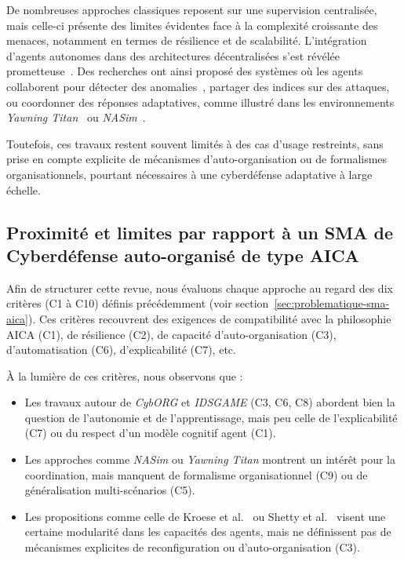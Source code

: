 \documentclass[ twoside,openright,titlepage,numbers=noenddot,headinclude,%
                footinclude=true,cleardoublepage=empty,abstractoff, %
                BCOR=5mm,paper=a4,fontsize=11pt,%
                french,american,%
                ]{scrreprt}
\begin{document}
De nombreuses approches classiques reposent sur une supervision centralisée, mais celle-ci présente des limites évidentes face à la complexité croissante des menaces, notamment en termes de résilience et de scalabilité. L'intégration d'agents autonomes dans des architectures décentralisées s'est révélée prometteuse~\cite{Sommer2010, Buczak2016}. Des recherches ont ainsi proposé des systèmes où les agents collaborent pour détecter des anomalies~\cite{Zhang2020, Nguyen2021}, partager des indices sur des attaques, ou coordonner des réponses adaptatives, comme illustré dans les environnements \emph{Yawning Titan}~\cite{Kroese2021} ou \emph{NASim}~\cite{Shetty2021}.

Toutefois, ces travaux restent souvent limités à des cas d'usage restreints, sans prise en compte explicite de mécanismes d'auto-organisation ou de formalismes organisationnels, pourtant nécessaires à une cyberdéfense adaptative à large échelle.

\subsection*{Proximité et limites par rapport à un SMA de Cyberdéfense auto-organisé de type AICA}

Afin de structurer cette revue, nous évaluons chaque approche au regard des dix critères (C1 à C10) définis précédemment (voir section~\ref{sec:problematique-sma-aica}). Ces critères recouvrent des exigences de compatibilité avec la philosophie AICA (C1), de résilience (C2), de capacité d'auto-organisation (C3), d'automatisation (C6), d'explicabilité (C7), etc.

À la lumière de ces critères, nous observons que :
\begin{itemize}
    \item Les travaux autour de \emph{CybORG} et \emph{IDSGAME} (C3, C6, C8) abordent bien la question de l'autonomie et de l'apprentissage, mais peu celle de l'explicabilité (C7) ou du respect d'un modèle cognitif agent (C1).
    \item Les approches comme \emph{NASim} ou \emph{Yawning Titan} montrent un intérêt pour la coordination, mais manquent de formalisme organisationnel (C9) ou de généralisation multi-scénarios (C5).
    \item Les propositions comme celle de Kroese et al.~\cite{Kroese2021} ou Shetty et al.~\cite{Shetty2021} visent une certaine modularité dans les capacités des agents, mais ne définissent pas de mécanismes explicites de reconfiguration ou d'auto-organisation (C3).
\end{itemize}
\end{document}
